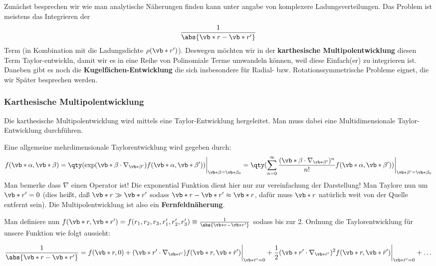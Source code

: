 Zunächst besprechen wir wie man analytische Näherungen finden kann
unter angabe von komplexere Ladungsverteilungen. 
Das Problem ist meistens das Integrieren der
\begin{equation*}
  \frac{1}{\abs{\vb*r-\vb*r'}}
\end{equation*}
Term (in Kombination mit die Ladungsdichte $\rho(\vb*r')$). 
Deswegen möchten wir in der \textbf{karthesische Multipolentwicklung} 
diesen  Term Taylor-entwickln, damit wir es in eine 
Reihe von Polinomiale Terme umwandeln können, 
weil diese Einfach(er) zu integrieren ist. 
Daneben gibt es noch die \textbf{Kugelfächen-Entwicklung} die sich 
insbesondere für Radial- bzw. Rotationssymmetrische Probleme eignet, 
die wir Später besprechen werden. 

\subsubsection{Karthesische Multipolentwicklung}%
\label{ssub:Karthesische-Multipolentwicklung}
Die karthesische Multipolentwicklung wird mittels eine Taylor-Entwicklung
hergeleitet. Man muss dabei eine Multidimensionale Taylor-Entwicklung 
durchführen.

Eine allgemeine mehrdimensionale Taylorentwicklung wird gegeben durch:
\begin{equation*}
  f(\vb*\alpha, \vb*\beta)
  =\qty(\exp(\vb*\beta\cdot\nabla_{\vb*\beta'})
  f(\vb*\alpha, \vb*\beta'))
  \bigg|_{\vb*\beta=\vb*\beta_0}
  =\qty(\sum_{n=0}^\infty
  \frac{(\vb*\beta\cdot\nabla_{\vb*\beta'})^n}{n!}
  f(\vb*\alpha, \vb*\beta'))
  \bigg|_{\vb*\beta'=\vb*\beta_0}
\end{equation*}
Man bemerke dass $\nabla$ einen Operator ist! Die exponential Funktion
dient hier nur zur vereinfachung der Darstellung! Man Taylore nun um $\vb*r'=0$ (dies heißt, daß $\vb*r\gg\vb*r'$ sodass 
$\vb*r-\vb*r'\approx\vb*r$, dafür muss $\vb*r$ natürlich weit
von der Quelle entfernt sein). Die Multipolentwicklung ist also ein 
\textbf{Fernfeldnäherung}.

Man definiere nun $f(\vb*r,\vb*r')=f(r_1,r_2,r_3,r_1',r_2',r_3')
\equiv\frac{1}{\abs{\vb*r-\vb*r'}}$ sodass bis zur 2. Ordnung die Taylorentwicklung für unsere Funktion
wie folgt aussieht:

\begin{equation*}
  \frac{1}{\abs{\vb*r-\vb*r'}}=f(\vb*r, 0)
  + (\vb*r'\cdot \nabla_{\vb*{\bar{r}'}}) f(\vb*r, \vb*{\bar{r}}')\bigg|_{\vb*{\bar{r}}'=0}
  + \frac{1}{2}(\vb*r'\cdot\nabla_{\vb*{\bar r'}})^2
  f(\vb*r,\vb*{\bar r}')
  \bigg|_{\vb*{\bar r'}=0}
  + \ldots
\end{equation*}

